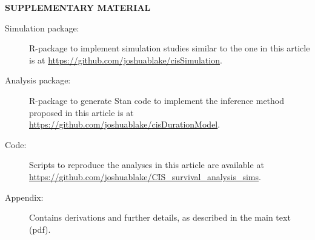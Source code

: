 \documentclass[12pt]{article}
\newcommand{\psens}{p_\text{sens}}
\begin{document}








\bigskip
\begin{center}
{\large\bf SUPPLEMENTARY MATERIAL}
\end{center}

\begin{description}

\item[Simulation package:] R-package to implement simulation studies similar to the one in this article is at \url{https://github.com/joshuablake/cisSimulation}.

\item[Analysis package:] R-package to generate Stan code to implement the inference method proposed in this article is at \url{https://github.com/joshuablake/cisDurationModel}.

\item[Code:] Scripts to reproduce the analyses in this article are available at \url{https://github.com/joshuablake/CIS_survival_analysis_sims}.

\item[Appendix:] Contains derivations and further details, as described in the main text (pdf).

\end{description}
\end{document}
